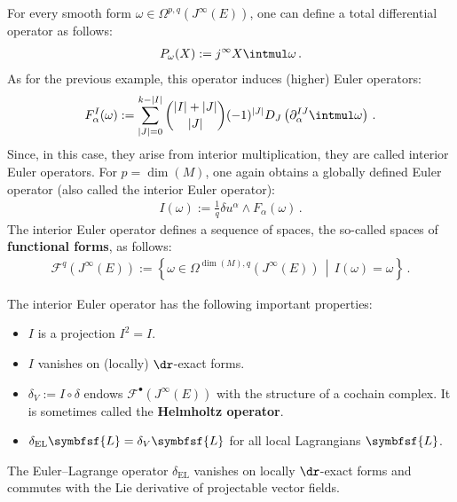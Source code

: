     \begin{example}
        For every smooth form $\omega\in\Omega^{p,q}(J^\infty(E))$, one can define a total differential operator as follows:
        \begin{gather}
            P_\omega(X) := j^\infty X\intmul\omega\,.
        \end{gather}
        As for the previous example, this operator induces (higher) Euler operators:
        \begin{gather}
            \label{var:interior_euler_operators}
            F^I_\alpha(\omega) := \sum_{|J|=0}^{k-|I|}\binom{|I|+|J|}{|J|}(-1)^{|J|}D_J\left(\partial^{IJ}_\alpha\intmul\omega\right)\,.
        \end{gather}
        Since, in this case, they arise from interior multiplication, they are called interior Euler operators. For $p=\dim(M)$, one again obtains a globally defined Euler operator (also called the interior Euler operator):
        \begin{gather}
            I(\omega) := \frac{1}{q}\delta u^\alpha\wedge F_\alpha(\omega)\,.
        \end{gather}
        The interior Euler operator defines a sequence of spaces, the so-called spaces of \textbf{functional forms}, as follows:
        \begin{gather}
            \label{var:functional_complex}
            \mathcal{F}^q(J^\infty(E)) := \left\{\omega\in\Omega^{\dim(M),q}(J^\infty(E))\,\middle\vert\,I(\omega)=\omega\right\}\,.
        \end{gather}
    \end{example}
    \begin{property}\label{var:I_properties}
        The interior Euler operator has the following important properties:
        \begin{itemize}
            \item $I$ is a projection $I^2=I$.
            \item $I$ vanishes on (locally) $\dr$-exact forms.
            \item $\delta_V := I\circ\delta$ endows $\mathcal{F}^\bullet(J^\infty(E))$ with the structure of a cochain complex. It is sometimes called the \textbf{Helmholtz operator}.
            \item $\delta_{\text{EL}}\symbfsf{L} = \delta_V\symbfsf{L}$ for all local Lagrangians $\symbfsf{L}$.
        \end{itemize}
    \end{property}
    \begin{result}\label{var:EL_operator_properties}
        The Euler--Lagrange operator $\delta_{\text{EL}}$ vanishes on locally $\dr$-exact forms and commutes with the Lie derivative of projectable vector fields.
    \end{result}

